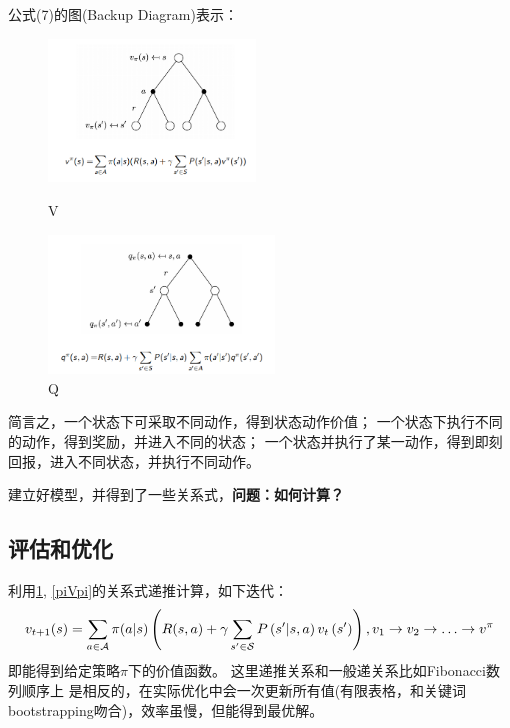 \documentclass[UTF8]{ctexart}
\begin{document}
公式(7)的图(Backup Diagram)表示：

\begin{figure}[htbp]
	\centering
	\begin{minipage}[t]{0.48\textwidth}
	\centering
	\includegraphics[width=5.5cm, height=3.8cm]{./pic/vpi.png}
	\caption{V}
	\label{piVpi}
	\end{minipage}
	\begin{minipage}[t]{0.48\textwidth}
		\centering
		\includegraphics[width=6cm,height=3.7cm]{./pic/qpi.png}
		\caption{Q}
		\label{picQpi}
	\end{minipage}
\end{figure}

简言之，一个状态下可采取不同动作，得到状态动作价值；
一个状态下执行不同的动作，得到奖励，并进入不同的状态；
一个状态并执行了某一动作，得到即刻回报，进入不同状态，并执行不同动作。

建立好模型，并得到了一些关系式，\textbf{问题：如何计算？}

\subsection{评估和优化}

利用\ref{picQpi}, \ref{piVpi}的关系式递推计算，如下迭代：
$$v_{t+1}(s)=\sum_{a \in \mathcal{A}} \pi(a | s)\left(R(s, a)+\gamma \sum_{s^{\prime} 
\in \mathcal{S}} P\left(s^{\prime} | s, a\right) v_{t}\left(s^{\prime}\right)\right),\\
v_{1} \rightarrow v_{2} \rightarrow \ldots \rightarrow v^{\pi}$$
即能得到给定策略$\pi$下的价值函数。
这里递推关系和一般递关系比如Fibonacci数列顺序上
是相反的，在实际优化中会一次更新所有值(有限表格，和关键词bootstrapping吻合)，效率虽慢，但能得到最优解。
\end{document}
